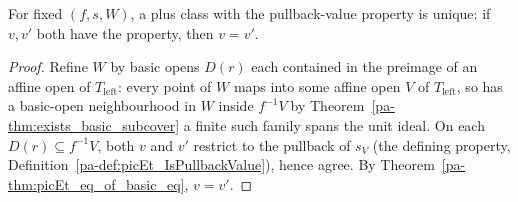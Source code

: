\begin{theorem}
  \label{pa-thm:picEt_pullbackValue_unique}
  \leanok

  For fixed \((f, s, W)\), a plus class with the pullback-value property is unique: if \(v, v'\)
  both have the property, then \(v = v'\).
\end{theorem}
\begin{proof}
  \leanok
  Refine \(W\) by basic opens \(D(r)\) each contained in the preimage of an affine open of
  \(T_{\mathrm{left}}\): every point of \(W\) maps into some affine open \(V\) of
  \(T_{\mathrm{left}}\), so has a basic-open neighbourhood in \(W\) inside \(f^{-1}V\; \)by
  Theorem~\ref{pa-thm:exists_basic_subcover} a finite such family spans the unit ideal. On each
  \(D(r) \subseteq f^{-1}V\), both \(v\) and \(v'\) restrict to the pullback of \(s_V\) (the
  defining property, Definition~\ref{pa-def:picEt_IsPullbackValue}), hence agree. By
  Theorem~\ref{pa-thm:picEt_eq_of_basic_eq}, \(v = v'\).
\end{proof}

